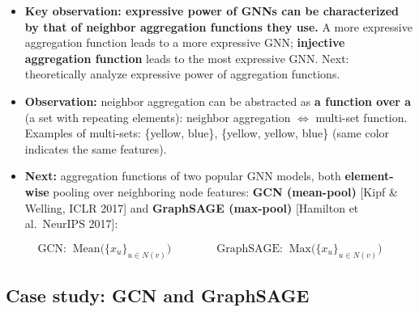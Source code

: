 \begin{itemize}
  \item \textbf{Key observation: expressive power of GNNs can be characterized by
    that of neighbor aggregation functions they use.} A more expressive
    aggregation function leads to a more expressive GNN; \textbf{injective
    aggregation function} leads to the most expressive GNN. Next: theoretically
    analyze expressive power of aggregation functions.
  \item \textbf{Observation:} neighbor aggregation can be abstracted as \textbf{a
    function over a } (a set with repeating elements): neighbor
    aggregation $\Leftrightarrow$ multi-set function. Examples of multi-sets:
    \{yellow, blue\}, \{yellow, yellow, blue\} (same color indicates the same
    features).
  \item \textbf{Next:} aggregation functions of two popular GNN models, both
    \textbf{element-wise} pooling over neighboring node features:
    \textbf{GCN (mean-pool)} [Kipf \& Welling, ICLR 2017] and \textbf{GraphSAGE
    (max-pool)} [Hamilton et al.\ NeurIPS 2017]:
\end{itemize}
\begin{equation}\label{eq:lec06-meanmax}
  \text{GCN: }\ \mathrm{Mean}\big(\{x_u\}_{u\in N(v)}\big)
  \qquad\qquad
  \text{GraphSAGE: }\ \mathrm{Max}\big(\{x_u\}_{u\in N(v)}\big)
\end{equation}

\subsection{Case study: GCN and GraphSAGE}\label{sec:lec06-case}


